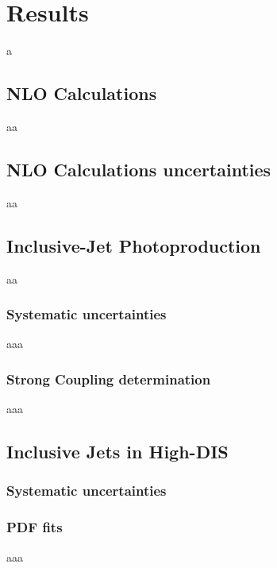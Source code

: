 \chapter{Results}
\label{ch:results}
a
\section{NLO Calculations}
aa
\section{NLO Calculations uncertainties}
aa
\section{Inclusive-Jet Photoproduction}
aa
\subsection{Systematic uncertainties}
aaa
\subsection{Strong Coupling determination}
aaa
\section{Inclusive Jets in High-\qsq DIS}
\label{sec:incljetsncdis}


\subsection{Systematic uncertainties}
\label{subsec:systunc}

\subsection{PDF fits}
aaa